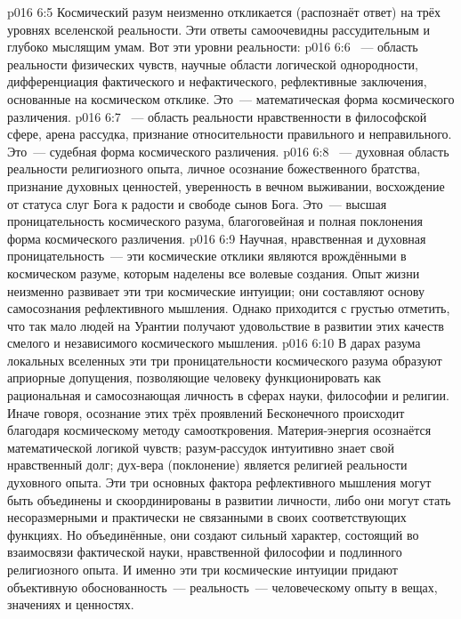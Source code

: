 \vs p016 6:5 Космический разум неизменно откликается (распознаёт ответ) на трёх уровнях вселенской реальности. Эти ответы самоочевидны рассудительным и глубоко мыслящим умам. Вот эти уровни реальности:
\vs p016 6:6 ~--- область реальности физических чувств, научные области логической однородности, дифференциация фактического и нефактического, рефлективные заключения, основанные на космическом отклике. Это~--- математическая форма космического различения.
\vs p016 6:7 ~--- область реальности нравственности в философской сфере, арена рассудка, признание относительности правильного и неправильного. Это~--- судебная форма космического различения.
\vs p016 6:8 ~--- духовная область реальности религиозного опыта, личное осознание божественного братства, признание духовных ценностей, уверенность в вечном выживании, восхождение от статуса слуг Бога к радости и свободе сынов Бога. Это~--- высшая проницательность космического разума, благоговейная и полная поклонения форма космического различения.
\vs p016 6:9 \pc Научная, нравственная и духовная проницательность~--- эти космические отклики являются врождёнными в космическом разуме, которым наделены все волевые создания. Опыт жизни неизменно развивает эти три космические интуиции; они составляют основу самосознания рефлективного мышления. Однако приходится с грустью отметить, что так мало людей на Урантии получают удовольствие в развитии этих качеств смелого и независимого космического мышления.
\vs p016 6:10 \pc В дарах разума локальных вселенных эти три проницательности космического разума образуют априорные допущения, позволяющие человеку функционировать как рациональная и самосознающая личность в сферах науки, философии и религии. Иначе говоря, осознание  этих трёх проявлений Бесконечного происходит благодаря космическому методу самооткровения. Материя\hyp{}энергия осознаётся математической логикой чувств; разум\hyp{}рассудок интуитивно знает свой нравственный долг; дух\hyp{}вера (поклонение) является религией реальности духовного опыта. Эти три основных фактора рефлективного мышления могут быть объединены и скоординированы в развитии личности, либо они могут стать несоразмерными и практически не связанными в своих соответствующих функциях. Но объединённые, они создают сильный характер, состоящий во взаимосвязи фактической науки, нравственной философии и подлинного религиозного опыта. И именно эти три космические интуиции придают объективную обоснованность~--- реальность~--- человеческому опыту в вещах, значениях и ценностях.
